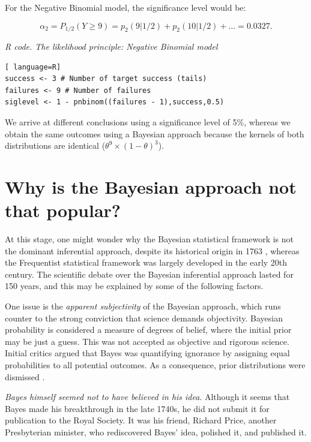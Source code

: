 For the Negative Binomial model, the significance level would be:

\begin{equation*}
	\alpha_2=P_{1/2}(Y\geq 9)=p_2(9|1/2)+p_2(10|1/2)+\ldots=0.0327.
\end{equation*}

\begin{tcolorbox}[enhanced,width=4.67in,center upper,
	fontupper=\large\bfseries,drop shadow southwest,sharp corners]
	\textit{R code. The likelihood principle: Negative Binomial model}
\begin{VF}
\begin{lstlisting}[ language=R]
success <- 3 # Number of target success (tails)
failures <- 9 # Number of failures
siglevel <- 1 - pnbinom((failures - 1),success,0.5)
\end{lstlisting}
\end{VF}
\end{tcolorbox}

We arrive at different conclusions using a significance level of 5\%, whereas we obtain the same outcomes using a Bayesian approach because the kernels of both distributions are identical ($\theta^9 \times (1 - \theta)^3$).

\section{Why is the Bayesian approach not that popular?}\label{sec25}

At this stage, one might wonder why the Bayesian statistical framework is not the dominant inferential approach, despite its historical origin in 1763 \cite{bayes1763lii}, whereas the Frequentist statistical framework was largely developed in the early 20th century. The scientific debate over the Bayesian inferential approach lasted for 150 years, and this may be explained by some of the following factors.

One issue is the \textit{apparent subjectivity} of the Bayesian approach, which runs counter to the strong conviction that science demands objectivity. Bayesian probability is considered a measure of degrees of belief, where the initial prior may be just a guess. This was not accepted as objective and rigorous science. Initial critics argued that Bayes was quantifying ignorance by assigning equal probabilities to all potential outcomes. As a consequence, prior distributions were dismissed \cite{mcgrayne2011theory}.

\textit{Bayes himself seemed not to have believed in his idea}. Although it seems that Bayes made his breakthrough in the late 1740s, he did not submit it for publication to the Royal Society. It was his friend, Richard Price, another Presbyterian minister, who rediscovered Bayes' idea, polished it, and published it.

